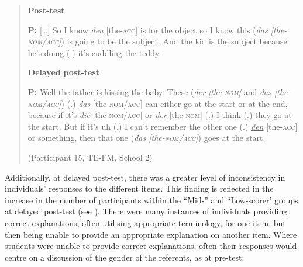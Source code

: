 \documentclass[output=paper]{langscibook}
\begin{document}
\begin{quote}
  \textbf{Post-test} 

  \textbf{P:} [\ldots] So I know \textit{\ul{den}} [the-\textsc{acc}] is for the object so I know   this (\textit{das [the-\textsc{nom/acc}]}) is going to be the subject. And the   kid is the subject because he’s doing (.) it’s cuddling the teddy. 

  \textbf{Delayed} \textbf{post-test} 

  \textbf{P:} Well the father is kissing the baby. These (\textit{der [the-\textsc{nom}]} and \textit{das [the-\textsc{nom/acc}]}) (.) \textit{\ul{das}} [the-\textsc{nom/acc}] can either   go at the start or at the end, because if it’s \textit{\ul{die}} [the-\textsc{nom/acc}]   or \textit{\ul{der}} [the-\textsc{nom}] (.) I think (.) they go at the start. But if it’s uh   (.) I can’t remember the other one (.) \textit{\ul{den}} [the-\textsc{acc}] or   something, then that one (\textit{das [the-\textsc{nom/acc}]}) goes at the   start. 

(Participant 15, TE-FM, School 2)
\end{quote}

Additionally, at delayed post-test, there was a greater level of inconsistency in individuals’ responses to the different items. This finding is reflected in the increase in the number of participants within the ``Mid-'' and ``Low-scorer’ groups at delayed post-test (see ). There were many instances of individuals providing correct explanations, often utilising appropriate terminology, for one item, but then being unable to provide an appropriate explanation on another item. Where students were unable to provide correct explanations, often their responses would centre on a discussion of the gender of the referents, as at pre-test:
\end{document}
